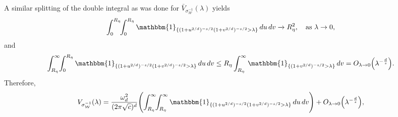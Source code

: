 \documentclass[a4paper,12pt]{article}
\let\originalleft\left
\let\originalright\right
\renewcommand{\left}{\mathopen{}\mathclose\bgroup\originalleft}
\renewcommand{\right}{\aftergroup\egroup\originalright}
\newcommand{\symbolnotsobw}{\symbolnot_{\mathcal{W}}}
\newcommand{\symbolnot}{\sigma}
\begin{document}

\iffalse 
A similar splitting of the double integral as was done for $\bar V_{\symbolnotsobw^{-1}}(\lambda)$
yields 
\begin{equation*}
    \int_0^{R_\eta}\!\!\int_0^{R_\eta}\mathbbm{1}_{\{(1+u^{2/d})^{-s/2}(1+v^{2/d})^{-s/2}>\lambda\}}
    \,du\,dv
    \xrightarrow{} R_\eta^2,
    \quad \text{as }\lambda \to 0,
\end{equation*}
and  
\begin{align*}
    \int_{R_\eta}^\infty\!\!\int_0^{R_\eta} \mathbbm{1}_{\{(1+u^{2/d})^{-s/2}(1+v^{2/d})^{-s/2}>\lambda\}}
    \,du\,dv
    \leq R_\eta \int_{R_\eta}^\infty \mathbbm{1}_{\{(1+v^{2/d})^{-s/2}>\lambda\}}
    \,dv 
    = O_{\lambda \to 0} \left(\lambda^{-\frac{d}{s}}\right).
\end{align*}
Therefore, 
\begin{equation*}
    V_{\symbolnotsobw^{-1}}(\lambda)
    = \frac{\omega_d^2}{(2\pi\sqrt{c})^{d}}
    \left(
    \int_{R_\eta}^\infty\!\!\int_{R_\eta}^\infty 
    \mathbbm{1}_{\{(1+u^{2/d})^{-s/2}(1+v^{2/d})^{-s/2}>\lambda\}}
    \,du\,dv\right) 
    + O_{\lambda \to 0} \left(\lambda^{-\frac{d}{s}}\right),
\end{equation*}
\end{document}

